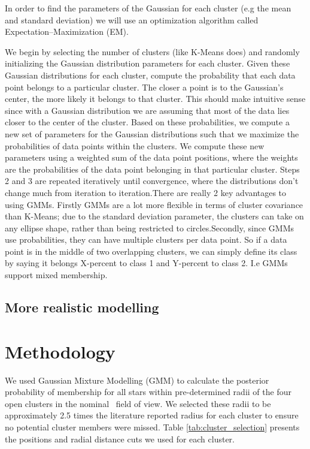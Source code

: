 In order to find the parameters of the Gaussian for each cluster (e.g the mean and standard deviation) we will use an optimization algorithm called Expectation–Maximization (EM).

We begin by selecting the number of clusters (like K-Means does) and randomly initializing the Gaussian distribution parameters for each cluster.
Given these Gaussian distributions for each cluster, compute the probability that each data point belongs to a particular cluster. The closer a point is to the Gaussian’s center, the more likely it belongs to that cluster. This should make intuitive sense since with a Gaussian distribution we are assuming that most of the data lies closer to the center of the cluster.
Based on these probabilities, we compute a new set of parameters for the Gaussian distributions such that we maximize the probabilities of data points within the clusters. We compute these new parameters using a weighted sum of the data point positions, where the weights are the probabilities of the data point belonging in that particular cluster.
Steps 2 and 3 are repeated iteratively until convergence, where the distributions don’t change much from iteration to iteration.There are really 2 key advantages to using GMMs. Firstly GMMs are a lot more flexible in terms of cluster covariance than K-Means; due to the standard deviation parameter, the clusters can take on any ellipse shape, rather than being restricted to circles.Secondly, since GMMs use probabilities, they can have multiple clusters per data point. So if a data point is in the middle of two overlapping clusters, we can simply define its class by saying it belongs X-percent to class 1 and Y-percent to class 2. I.e GMMs support mixed membership.


\subsection{More realistic modelling}

\section{Methodology}

We used Gaussian Mixture Modelling (GMM) to calculate the posterior probability of membership for all stars within pre-determined radii of the four open clusters in the nominal \Kepler~field of view. We selected these radii to be approximately 2.5 times the literature reported radius for each cluster to ensure no potential cluster members were missed. Table \ref{tab:cluster_selection} presents the positions and radial distance cuts we used for each cluster. 

